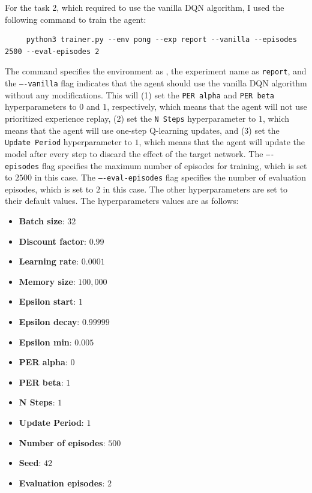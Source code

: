 For the task 2, which required to use the vanilla DQN algorithm, I used the following command to train the agent:

\begin{verbatim}
     python3 trainer.py --env pong --exp report --vanilla --episodes 2500 --eval-episodes 2
\end{verbatim}

The command specifies the environment as \pong, the experiment name as \texttt{report}, and the \texttt{----vanilla} flag indicates that the agent should use the vanilla DQN algorithm without any modifications. This will (1) set the \texttt{PER alpha} and \texttt{PER beta} hyperparameters to $0$ and $1$, respectively, which means that the agent will not use prioritized experience replay, (2) set the \texttt{N Steps} hyperparameter to $1$, which means that the agent will use one-step Q-learning updates, and (3) set the \texttt{Update Period} hyperparameter to $1$, which means that the agent will update the model after every step to discard the effect of the target network.
The \texttt{----episodes} flag specifies the maximum number of episodes for training, which is set to $2500$ in this case.
The \texttt{----eval-episodes} flag specifies the number of evaluation episodes, which is set to $2$ in this case.
The other hyperparameters are set to their default values.
The hyperparameters values are as follows:
\begin{itemize}
    \item \textbf{Batch size}: $32$
    \item \textbf{Discount factor}: $0.99$
    \item \textbf{Learning rate}: $0.0001$
    \item \textbf{Memory size}: $100,000$
    \item \textbf{Epsilon start}: $1$
    \item \textbf{Epsilon decay}: $0.99999$
    \item \textbf{Epsilon min}: $0.005$
    \item \textbf{PER alpha}: $0$
    \item \textbf{PER beta}: $1$
    \item \textbf{N Steps}: $1$
    \item \textbf{Update Period}: $1$
    \item \textbf{Number of episodes}: $500$
    \item \textbf{Seed}: $42$
    \item \textbf{Evaluation episodes}: $2$
\end{itemize}

